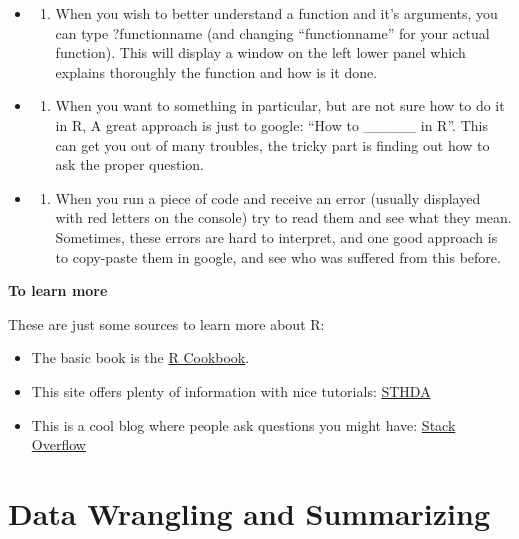 \documentclass[
]{book}
\providecommand{\tightlist}{%
  \setlength{\itemsep}{0pt}\setlength{\parskip}{0pt}}
\begin{document}
\begin{itemize}
\item
  \begin{enumerate}
  \def\labelenumi{\arabic{enumi}.}
  \tightlist
  \item
    When you wish to better understand a function and it's arguments, you can type ?functionname (and changing ``functionname'' for your actual function). This will display a window on the left lower panel which explains thoroughly the function and how is it done.
  \end{enumerate}
\item
  \begin{enumerate}
  \def\labelenumi{\arabic{enumi}.}
  \setcounter{enumi}{1}
  \tightlist
  \item
    When you want to something in particular, but are not sure how to do it in R, A great approach is just to google: ``How to \_\_\_\_\_ in R''. This can get you out of many troubles, the tricky part is finding out how to ask the proper question.
  \end{enumerate}
\item
  \begin{enumerate}
  \def\labelenumi{\arabic{enumi}.}
  \setcounter{enumi}{2}
  \tightlist
  \item
    When you run a piece of code and receive an error (usually displayed with red letters on the console) try to read them and see what they mean. Sometimes, these errors are hard to interpret, and one good approach is to copy-paste them in google, and see who was suffered from this before.
  \end{enumerate}
\end{itemize}

\textbf{To learn more}

These are just some sources to learn more about R:

\begin{itemize}
\item
  The basic book is the \href{https://rc2e.com/}{R Cookbook}.
\item
  This site offers plenty of information with nice tutorials: \href{http://www.sthda.com/english/}{STHDA}
\item
  This is a cool blog where people ask questions you might have: \href{https://stackoverflow.com/}{Stack Overflow}
\end{itemize}

\hypertarget{data-wrangling-and-summarizing}{%
\chapter{Data Wrangling and Summarizing}\label{data-wrangling-and-summarizing}}
\end{document}
